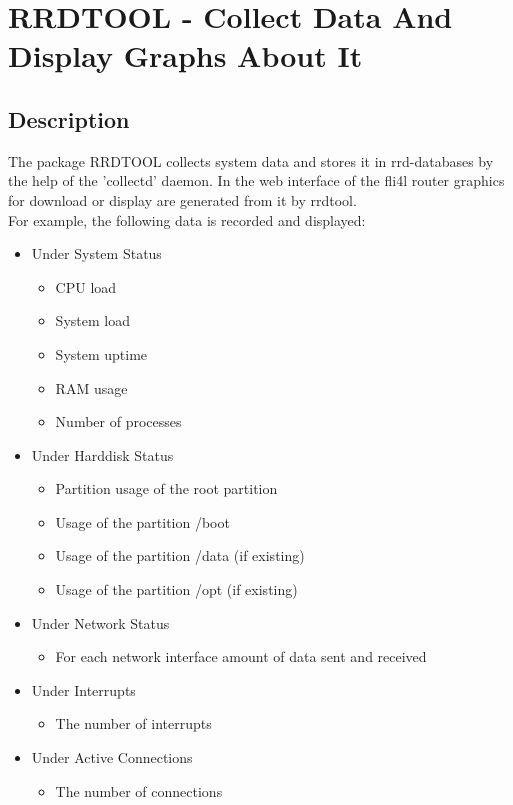 \section {RRDTOOL - Collect Data And Display Graphs About It}

\subsection {Description}
The package RRDTOOL collects system data and stores it in rrd-databases by
the help of the 'collectd' daemon.
In the web interface of the fli4l router graphics for download or display
are generated from it by rrdtool.
\\
For example, the following data is recorded and displayed:
 \begin{itemize}
  \item Under System Status
  \begin{itemize}
   \item CPU load
   \item System load
   \item System uptime
   \item RAM usage
   \item Number of processes
  \end{itemize}
  \item Under Harddisk Status
   \begin{itemize}
   \item Partition usage of the root partition
   \item Usage of the partition /boot
   \item Usage of the partition /data (if existing)
   \item Usage of the partition /opt (if existing)
  \end{itemize}
  \item Under Network Status
  \begin{itemize}
   \item For each network interface amount of data sent and received
  \end{itemize}
  \item Under Interrupts
  \begin{itemize}
   \item The number of interrupts
  \end{itemize}
  \item Under Active Connections
  \begin{itemize}
   \item The number of connections
  \end{itemize}
 \end{itemize}

